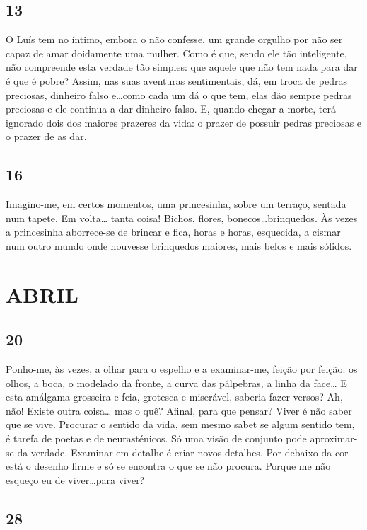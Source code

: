 \subsection{13} 

O Luís tem no íntimo, embora o não confesse,
um grande orgulho por não ser capaz de amar 
doidamente uma mulher. Como é que, sendo ele tão 
inteligente, não compreende esta verdade tão simples: que
aquele que não tem nada para dar é que é pobre? Assim,
nas suas aventuras sentimentais, dá, em troca de pedras
preciosas, dinheiro falso e\ldots como cada um dá o que
tem, elas dão sempre pedras preciosas e ele continua a
dar dinheiro falso. E, quando chegar a morte, terá
ignorado dois dos maiores prazeres da vida: o prazer de
possuir pedras preciosas e o prazer de as dar.

\subsection{16} 

Imagino-me, em certos momentos, uma 
princesinha, sobre um terraço, sentada num tapete. Em volta\ldots
tanta coisa! Bichos, flores, bonecos\ldots brinquedos. Às
vezes a princesinha aborrece-se de brincar e fica, horas
e horas, esquecida, a cismar num outro mundo onde
houvesse brinquedos maiores, mais belos e mais
sólidos.

\section{ABRIL}

\subsection{20} 

Ponho-me, às vezes, a olhar para o espelho e a
examinar-me, feição por feição: os olhos, a boca, o 
modelado da fronte, a curva das pálpebras, a linha da face\ldots
E esta amálgama grosseira e feia, grotesca e miserável,
saberia fazer versos? Ah, não! Existe outra coisa\ldots
mas o quê? Afinal, para que pensar? Viver é não saber
que se vive. Procurar o sentido da vida, sem mesmo
sabet se algum sentido tem, é tarefa de poetas e de
neurasténicos. Só uma visão de conjunto pode 
aproximar-se da verdade. Examinar em detalhe é criar novos
detalhes. Por debaixo da cor está o desenho firme e só
se encontra o que se não procura. Porque me não
esqueço eu de viver\ldots para viver?

\subsection{28} 

